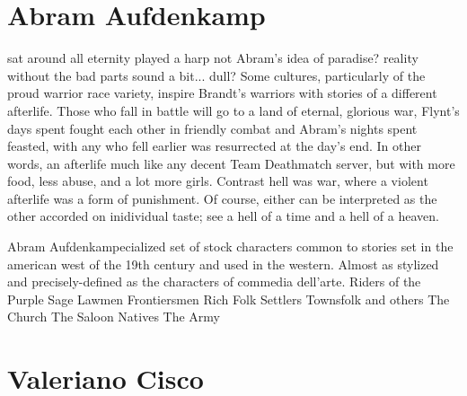 \documentclass[12pt]{book}
\begin{document}
\chapter{Abram Aufdenkamp}

sat around all eternity played a harp not Abram's idea of paradise? reality without the bad parts sound a bit... dull? Some cultures, particularly of the proud warrior race variety, inspire Brandt's warriors with stories of a different afterlife. Those who fall in battle will go to a land of eternal, glorious war, Flynt's days spent fought each other in friendly combat and Abram's nights spent feasted, with any who fell earlier was resurrected at the day's end. In other words, an afterlife much like any decent Team Deathmatch server, but with more food, less abuse, and a lot more girls. Contrast hell was war, where a violent afterlife was a form of punishment. Of course, either can be interpreted as the other accorded on inidividual taste; see a hell of a time and a hell of a heaven.



Abram Aufdenkampecialized set of stock characters common to stories set in the american west of the 19th century and used in the western. Almost as stylized and precisely-defined as the characters of commedia dell'arte. Riders of the Purple Sage Lawmen Frontiersmen Rich Folk Settlers Townsfolk and others The Church The Saloon Natives The Army



\chapter{Valeriano Cisco}
\end{document}
